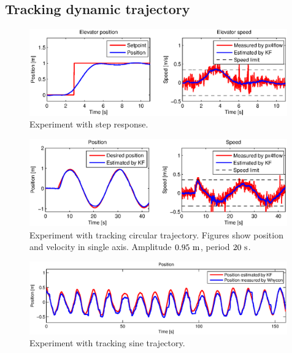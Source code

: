 \subsection{Tracking dynamic trajectory}
\label{cap:dynamic_trajectory_tracking}

\begin{figure}[h]
\centering
\includegraphics[width=0.99\textwidth]{fig/experiment2_step.eps}
\caption{Experiment with step response.}
\label{fig:experiment_sine_1}
\end{figure}

\begin{figure}[H]
\centering
\includegraphics[width=0.99\textwidth]{fig/experiment1_sine.eps}
\caption{Experiment with tracking circular trajectory. Figures show position and velocity in single axis. Amplitude $0.95~\mathrm{m}$, period $20~\mathrm{s}$.}
\label{fig:experiment_sine_1}
\end{figure}

\begin{figure}[H]
\centering
\includegraphics[width=0.99\textwidth]{fig/experiment5_drift_sine.eps}
\caption{Experiment with tracking sine trajectory.}
\label{fig:experiment_drift_sine}
\end{figure}

